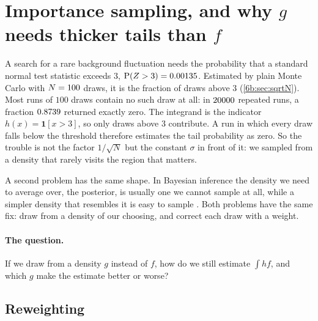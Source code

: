 \section{Importance sampling, and why $g$ needs thicker tails than $f$}
\label{6b:sec:importance}

A search for a rare background fluctuation needs the probability that a standard normal
test statistic exceeds $3$, $\operatorname{P}(Z>3)=0.00135$. Estimated by plain Monte Carlo
with $N=100$ draws, it is the fraction of draws above $3$ (\cref{6b:sec:sqrtN}).
Most runs of $100$ draws contain no such draw at all: in $20000$ repeated runs, a
fraction $0.8739$ returned exactly zero. The integrand is the indicator
$h(x)=\mathbf 1[x>3]$, so only draws above $3$ contribute. A run in which
every draw falls below the threshold therefore estimates the tail probability
as zero. So the trouble is not the factor
$1/\sqrt N$ but the constant $\sigma$ in front of it: we sampled from a density that
rarely visits the region that matters.

A second problem has the same shape. In Bayesian inference the density we need to
average over, the posterior, is usually one we cannot sample at all, while a simpler
density that resembles it is easy to sample . Both problems have the
same fix: draw from a density of our choosing, and correct each draw with a weight.

\paragraph{The question.} If we draw from a density $g$ instead of $f$, how do we still
estimate $\int hf$, and which $g$ make the estimate better or worse?

\subsection{Reweighting}
\label{6b:sec:is-derive}

